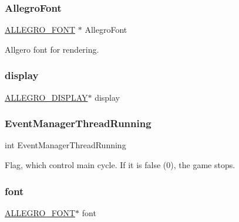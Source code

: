 \subsubsection{\texorpdfstring{Allegro\+Font}{AllegroFont}}
{\footnotesize\ttfamily \hyperlink{allegro__font_8h_af3fe7d773389432eb23c336db0c1d8bb}{A\+L\+L\+E\+G\+R\+O\+\_\+\+F\+O\+NT} $\ast$ Allegro\+Font}



Allgero font for rendering. 

\mbox{\label{group___library_merger_gaf64cc6c8a47e5ddbf510b5aa92e062b9}} 
\subsubsection{\texorpdfstring{display}{display}}
{\footnotesize\ttfamily \hyperlink{display_8h_a7516185aa39c086f4bc62bd4bf5858bf}{A\+L\+L\+E\+G\+R\+O\+\_\+\+D\+I\+S\+P\+L\+AY}$\ast$ display}

\mbox{\label{group___library_merger_ga1318fa5effb70983960c09c162701742}} 
\subsubsection{\texorpdfstring{Event\+Manager\+Thread\+Running}{EventManagerThreadRunning}}
{\footnotesize\ttfamily int Event\+Manager\+Thread\+Running}



Flag, which control main cycle. If it is false (0), the game stops. 

\mbox{\label{group___library_merger_gae4254615de94af5fc74d43e8b676dcf9}} 
\subsubsection{\texorpdfstring{font}{font}}
{\footnotesize\ttfamily \hyperlink{allegro__font_8h_af3fe7d773389432eb23c336db0c1d8bb}{A\+L\+L\+E\+G\+R\+O\+\_\+\+F\+O\+NT}$\ast$ font}


